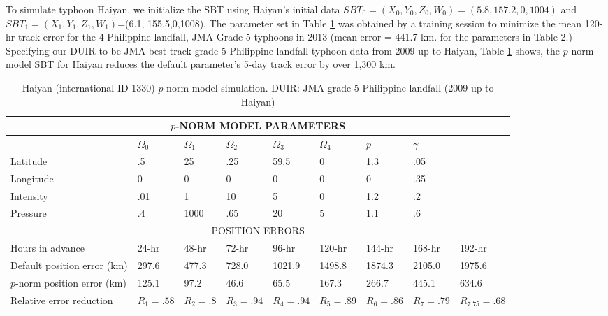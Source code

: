 \documentclass{SBCbookchapter}
\begin{document}
To simulate typhoon Haiyan, we initialize the SBT using Haiyan's initial data $SBT_0=(X_0,Y_0,Z_0,W_0)=(5.8, 157.2, 0, 1004)$ and  $SBT_1=(X_1,Y_1,Z_1,W_1)$=(6.1, 155.5,0,1008).  The parameter set in Table \ref{typ2}  was obtained by  a training session to minimize the mean 120-hr track error for the 4 Philippine-landfall, JMA Grade 5 typhoons in 2013  (mean error = 441.7 km. for the parameters in Table 2.)     Specifying our DUIR to be JMA best track grade 5 Philippine landfall typhoon data from 2009 up to Haiyan, Table \ref{typ2} shows, the $p$-norm model SBT for Haiyan reduces the default parameter's 5-day track error by over 1,300 km.

    \begin{table}[h]
\centering
\tiny
\begin{tabular}{|l|l|l|l|l|l|l|l|l|}
\multicolumn{9}{c}{$p$-NORM MODEL PARAMETERS }\\\hline
&$\Omega_0$ & $\Omega_1$ & $\Omega_2$ & $\Omega_3$ & $\Omega_4$ & $p$ &\multicolumn{2}{l|}{$\gamma$}\\\hline
Latitude &  .5 & 25 & .25 & 59.5 & 0 & 1.3 & \multicolumn{2}{l|}{.05} \\
Longitude &  0 & 0 & 0 & 0 & 0 & 0 & \multicolumn{2}{l|}{.35} \\
Intensity &  .01 & 1 & 10 & 5 & 0 & 1.2 & \multicolumn{2}{l|}{.2} \\
Pressure & .4 &1000&.65&20&5&1.1&\multicolumn{2}{l|}{.6} \\ \hline \hline
\multicolumn{9}{|c|}{POSITION ERRORS }\\\hline
  Hours in advance    & 24-hr & 48-hr &72-hr &96-hr & 120-hr & 144-hr & 168-hr& 192-hr\\\hline
  Default position error  (km)  &297.6  &477.3 & 728.0&1021.9 & 1498.8 &1874.3  & 2105.0 &  1975.6 \\\hline
  $p$-norm position error  (km)   &  125.1  &  97.2  & 46.6  & 65.5  & 167.3& 266.7  &  445.1&   634.6   \\\hline
  Relative error reduction & $R_1=.58 $  &$R_2=.8 $ &$R_3=.94 $ &$R_4=.94 $ &$R_5=.89 $ &$R_6=.86 $  &$R_7=.79 $ &  $R_{7.75} =.68 $   \\ \hline
 \end{tabular}
  \caption{Haiyan (international ID 1330) $p$-norm model simulation. DUIR: JMA grade 5 Philippine landfall (2009 up to Haiyan) }
  \label{typ2}
\end{table}
\end{document}

